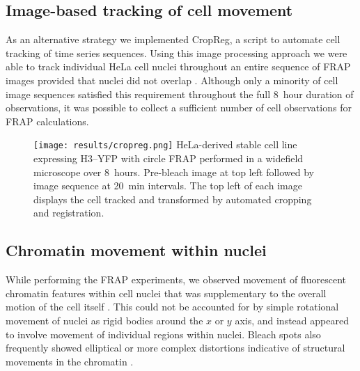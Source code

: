     \subsection{Image-based tracking of cell movement}

    As an alternative strategy we implemented CropReg, a script
    to automate cell tracking of time series sequences.
    Using this image processing approach we were
    able to track individual HeLa cell nuclei
    throughout an entire sequence of FRAP images
    provided that nuclei did not overlap .
    Although only a minority of cell image sequences satisfied this requirement
    throughout the full 8~hour duration of observations,
    it was possible to collect a sufficient number of
    cell observations for FRAP calculations.

    \begin{figure}
      \centering
      \texttt{[image: results/cropreg.png]}
        {
         HeLa-derived stable cell line expressing H3--YFP
         with circle FRAP performed in a widefield microscope over 8~hours.
         Pre-bleach image at top left followed by
         image sequence at 20~min intervals.
         The top left of each image displays the cell tracked and transformed
         by automated cropping and registration.
        }
      \label{fig:kill-frap:cropreg}
    \end{figure}

  \subsection{Chromatin movement within nuclei}

    While performing the FRAP experiments, we observed movement
    of fluorescent chromatin features
    within cell nuclei that was supplementary to the overall
    motion of the cell itself .
    This could not be accounted for by simple rotational movement of nuclei
    as rigid bodies around the $x$ or $y$ axis,
    and instead appeared to involve movement of
    individual regions within nuclei.
    Bleach spots also frequently showed elliptical or more complex distortions
    indicative of structural movements in the chromatin
    .


